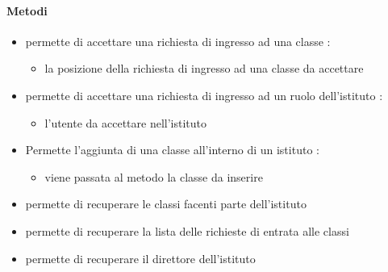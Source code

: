 \paragraph{Metodi}
\begin{itemize}
\item {}
\newline
permette di accettare una richiesta di ingresso ad una classe
\newline
{} :
\begin{itemize}
\item {}
\newline
la posizione della richiesta di ingresso ad una classe da accettare
\end{itemize}
\item {}
\newline
permette di accettare una richiesta di ingresso ad un ruolo dell'istituto
\newline
{} :
\begin{itemize}
\item {}
\newline
l'utente da accettare nell'istituto
\end{itemize}
\item {}
\newline
Permette l'aggiunta di una classe all'interno di un istituto
\newline
{} :
\begin{itemize}
\item {}
\newline
viene passata al metodo la classe da inserire
\end{itemize}
\item {}
\newline
permette di recuperare le classi facenti parte dell'istituto
\newline
\item {}
\newline
permette di recuperare la lista delle richieste di entrata alle classi
\newline
\item {}
\newline
permette di recuperare il direttore dell'istituto

\end{itemize}

